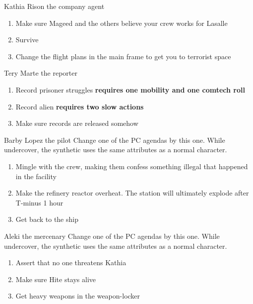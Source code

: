 \begin{rpg-commentbox}{Kathia Rison the company agent}
    \begin{enumerate}[label=\textbf{Act \arabic*}, leftmargin=1cm]
        \item Make sure Mageed and the others believe your crew works for Lasalle
        \item Survive
        \item Change the flight plans in the main frame to get you to terrorist space
    \end{enumerate}
    
\end{rpg-commentbox}


\begin{rpg-commentbox}{Tery Marte the reporter}
    \begin{enumerate}[label=\textbf{Act \arabic*}, leftmargin=1cm]
        \item Record prisoner struggles \textbf{requires one mobility and one comtech roll}
        \item Record alien \textbf{requires two slow actions}
        \item Make sure records are released somehow
    \end{enumerate}
\end{rpg-commentbox}



\begin{rpg-commentbox}{Barby Lopez the pilot}
    Change one of the PC agendas by this one. While undercover, the synthetic uses the same attributes as a normal character.

    \begin{enumerate}[label=\textbf{Act \arabic*}, leftmargin=1cm]
        \item Mingle with the crew, making them confess something illegal that happened in the facility
        \item Make the refinery reactor overheat. The station will ultimately explode after T-minus 1 hour
        \item Get back to the ship
    \end{enumerate}
\end{rpg-commentbox}


\begin{rpg-commentbox}{Aleki the mercenary}
    Change one of the PC agendas by this one. While undercover, the synthetic uses the same attributes as a normal character.

    \begin{enumerate}[label=\textbf{Act \arabic*}, leftmargin=1cm]
        \item Assert that no one threatens Kathia
        \item Make sure Hite stays alive
        \item Get heavy weapons in the weapon-locker
    \end{enumerate}
\end{rpg-commentbox}
